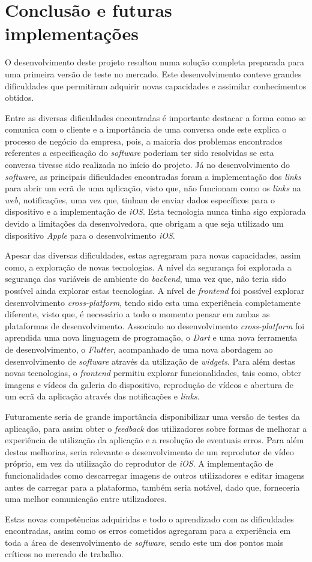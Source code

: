 \chapter{Conclusão e futuras implementações}

O desenvolvimento deste projeto resultou numa solução completa preparada para uma primeira versão de teste no mercado. Este desenvolvimento conteve grandes dificuldades que permitiram adquirir novas capacidades e assimilar conhecimentos obtidos.

Entre as diversas dificuldades encontradas é importante destacar a forma como se comunica com o cliente e a importância de uma conversa onde este explica o processo de negócio da empresa, pois, a maioria dos problemas encontrados referentes a especificação do \textit{software} poderiam ter sido resolvidas se esta conversa tivesse sido realizada no início do projeto. Já no desenvolvimento do \textit{software}, as principais dificuldades encontradas foram a implementação dos \textit{links} para abrir um ecrã de uma aplicação, visto que, não funcionam como os \textit{links} na \textit{web}, notificações, uma vez que, tinham de enviar dados específicos para o dispositivo e a implementação de \textit{iOS}. Esta tecnologia nunca tinha sigo explorada devido a limitações da desenvolvedora, que obrigam a que seja utilizado um dispositivo \textit{Apple} para o desenvolvimento \textit{iOS}.

Apesar das diversas dificuldades, estas agregaram para novas capacidades, assim como, a exploração de novas tecnologias. A nível da segurança foi explorada a segurança das variáveis de ambiente do \textit{backend}, uma vez que, não teria sido possível ainda explorar estas tecnologias. A nível de \textit{frontend} foi possível explorar desenvolvimento \textit{cross-platform}, tendo sido esta uma experiência completamente diferente, visto que, é necessário a todo o momento pensar em ambas as plataformas de desenvolvimento. Associado ao desenvolvimento \textit{cross-platform} foi aprendida uma nova linguagem de programação, o \textit{Dart} e uma nova ferramenta de desenvolvimento, o \textit{Flutter}, acompanhado de uma nova abordagem ao desenvolvimento de \textit{software} através da utilização de \textit{widgets}. Para além destas novas tecnologias, o \textit{frontend} permitiu explorar funcionalidades, tais como, obter imagens e vídeos da galeria do dispositivo, reprodução de vídeos e abertura de um ecrã da aplicação através das notificações e \textit{links}.

Futuramente seria de grande importância disponibilizar uma versão de testes da aplicação, para assim obter o \emph{feedback} dos utilizadores sobre formas de melhorar a experiência de utilização da aplicação e a resolução de eventuais erros. Para além destas melhorias, seria relevante o desenvolvimento de um reprodutor de vídeo próprio, em vez da utilização do reprodutor de \emph{iOS}. A implementação de funcionalidades como descarregar imagens de outros utilizadores e editar imagens antes de carregar para a plataforma, também seria notável, dado que, forneceria uma melhor comunicação entre utilizadores. 

Estas novas competências adquiridas e todo o aprendizado com as dificuldades encontradas, assim como os erros cometidos agregaram para a experiência em toda a área de desenvolvimento de \emph{software}, sendo este um dos pontos mais críticos no mercado de trabalho.


